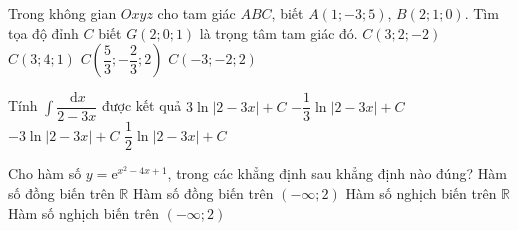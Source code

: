 \begin{ex}%
	Trong không gian $Oxyz$ cho tam giác $ABC$, biết $A(1;-3;5)$, $B(2;1;0)$. Tìm tọa độ đỉnh $C$ biết $G(2;0;1)$ là trọng tâm tam giác đó.
	\choice
	{\True $C(3;2;-2)$}
	{$C(3;4;1)$}
	{$C\left(\dfrac{5}{3};-\dfrac{2}{3};2\right)$}
	{$C(-3;-2;2)$}
\end{ex}


\begin{ex}%
	Tính $\displaystyle \int \dfrac{\mathrm{\,d}x}{2-3x}$ được kết quả
	\choice
	{$3\ln \left| 2-3x \right|+C$}
	{\True $-\dfrac{1}{3}\ln \left| 2-3x \right|+C$}
	{$-3\ln \left| 2-3x \right|+C$}
	{$\dfrac{1}{2}\ln \left| 2-3x \right|+C$}
\end{ex}


\begin{ex}%
	Cho hàm số $y=\mathrm{e}^{x^2-4x+1}$, trong các khẳng định sau khẳng định nào đúng?
	\choice
	{Hàm số đồng biến trên $\mathbb{R}$}
	{Hàm số đồng biến trên $(-\infty;2)$}
	{Hàm số nghịch biến trên $\mathbb{R}$}
	{\True Hàm số nghịch biến trên $(-\infty;2)$}
\end{ex}


